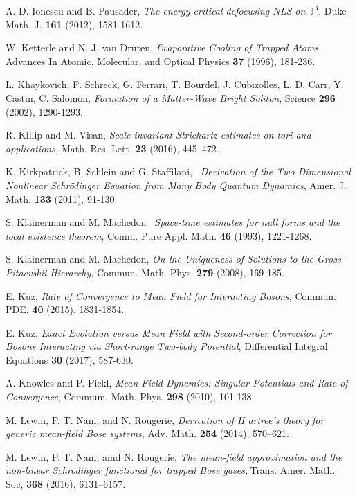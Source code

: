 \documentclass[12pt,letterpaper,leqno]{amsart}
\theoremstyle{plain}
\numberwithin{equation}{section}
\numberwithin{theorem}{section}
\numberwithin{proposition}{section}
\numberwithin{lemma}{section}
\numberwithin{corollary}{section}
\begin{document}
\begin{thebibliography}{99}
 A. D. Ionescu and B. Pausader, \emph{The energy-critical
defocusing NLS on }$\mathbb{T}^{3}$, Duke Math. J. \textbf{161} (2012),
1581-1612.

 W. Ketterle and N. J. van Druten, \emph{Evaporative
Cooling of Trapped Atoms, }Advances In Atomic, Molecular, and Optical
Physics \textbf{37} (1996), 181-236.

 L. Khaykovich, F. Schreck, G. Ferrari, T. Bourdel, J.
Cubizolles, L. D. Carr, Y. Castin, C. Salomon, \emph{Formation of a
Matter-Wave Bright Soliton}, Science \textbf{296 }(2002), 1290-1293.

 R. Killip and M. Visan, \emph{Scale invariant Strichartz
estimates on tori and applications, }Math. Res. Lett. \textbf{23} (2016),
445--472.

 K. Kirkpatrick, B. Schlein and G. Staffilani, \emph{\
Derivation of the Two Dimensional Nonlinear Schr\"{o}dinger Equation from
Many Body Quantum Dynamics}, Amer. J. Math. \textbf{133} (2011), 91-130.

 S. Klainerman and M. Machedon \emph{\
Space-time estimates for null forms and the local existence theorem}, Comm.
Pure Appl. Math. \textbf{46} (1993), 1221-1268.

 S. Klainerman and M. Machedon, \emph{On the
Uniqueness of Solutions to the Gross-Pitaevskii Hierarchy}, Commun. Math.
Phys. \textbf{279} (2008), 169-185.

 E. Kuz, \emph{Rate of Convergence to Mean Field for
Interacting Bosons}, Commun. PDE, \textbf{40} (2015), 1831-1854.

\bibitem{Kuz2} E. Kuz, \emph{Exact Evolution versus Mean Field with
Second-order Correction for Bosons Interacting via Short-range Two-body
Potential}, Differential Integral Equations \textbf{30 }(2017), 587-630.

\bibitem{KnowlesAndPickl} A. Knowles and P. Pickl, \emph{Mean-Field
Dynamics: Singular Potentials and Rate of Convergence}, Commum. Math. Phys. 
\textbf{298} (2010), 101-138.

 M. Lewin, P. T. Nam, and N. Rougerie, \emph{Derivation of {H}%
artree's theory for generic mean-field {B}ose systems}, Adv. Math. \textbf{%
254} (2014), 570--621.

 M. Lewin, P. T. Nam, amd N. Rougerie, \emph{The
mean-field approximation and the non-linear Schr\"{o}dinger functional for
trapped Bose gases,}$\ $Trans. Amer. Math. Soc, \textbf{368 }(2016),
6131--6157.


\end{thebibliography}
\end{document}
